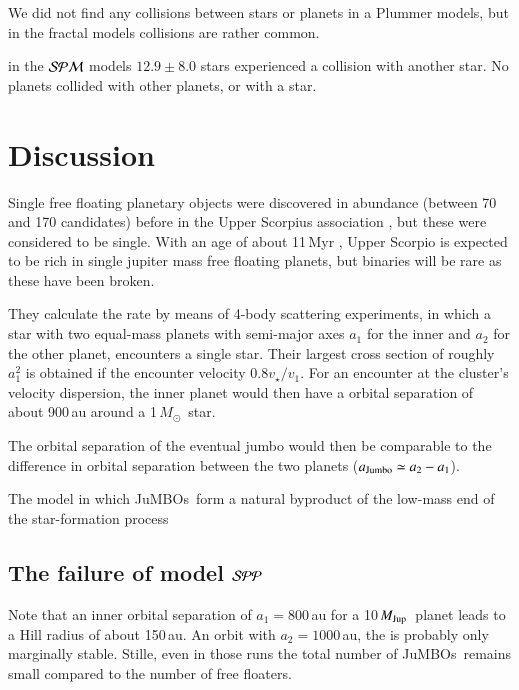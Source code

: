 \documentclass[aa]{lib/aa}
\newcommand{\MSun}{\mbox{${M}_\odot$}}
\newcommand{\MJup}{\mbox{${M}_{\rm Jup}$}}
\newcommand{\jumbos}{\mbox{JuMBOs}}
\begin{document}
We did not find any collisions between stars or planets in a Plummer
models, but in the fractal models collisions are rather common.

in the ${\cal SPM}$ models $12.9\pm8.0$ stars experienced a collision
with another star. No planets collided with other planets, or with a
star.



\section{Discussion}


Single free floating planetary objects were discovered in abundance
(between 70 and 170 candidates) before in the Upper Scorpius
association \cite{2022NatAs...6...89M}, but these were considered to
be single.  With an age of about 11\,Myr \cite{++}, Upper Scorpio is
expected to be rich in single jupiter mass free floating planets, but
binaries will be rare as these have been broken.



They calculate the rate by means of 4-body scattering experiments, in
which a star with two equal-mass planets with semi-major axes $a_1$
for the inner and $a_2$ for the other planet, encounters a single
star. Their largest cross section of roughly $a_1^2$ is obtained if
the encounter velocity $0.8v_\star/v_1$. For an encounter at the
cluster's velocity dispersion, the inner planet would then have a
orbital separation of about 900\,au around a 1\,\MSun\, star.

The orbital separation of the eventual jumbo would then be comparable
to the difference in orbital separation between the two planets
($a_{\rm Jumbo} \simeq a_2-a_1$).

The model in which \jumbos\, form a natural byproduct of the low-mass
end of the star-formation process

\subsection{The failure of model ${\cal SPP}$}

Note that an inner orbital separation of $a_1=800$\,au for a
10\,\MJup\, planet leads to a Hill radius of about 150\,au. An orbit
with $a_2=1000$\,au, the is probably only marginally stable.  Stille,
even in those runs the total number of \jumbos\, remains small
compared to the number of free floaters.
\end{document}
